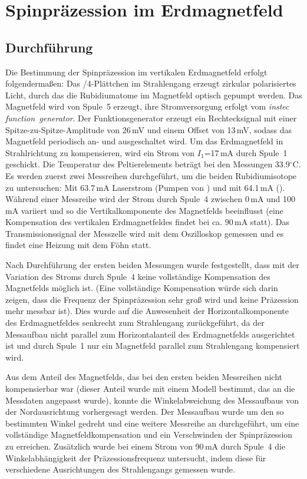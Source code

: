 \section{Spinpräzession im Erdmagnetfeld}
\subsection{Durchführung}
Die Bestimmung der Spinpräzession im vertikalen Erdmagnetfeld erfolgt folgendermaßen:
Das \textlambda/4-Plättchen im Strahlengang erzeugt zirkular polarisiertes Licht,
durch das die Rubidiumatome im Magnetfeld optisch gepumpt werden.
Das Magnetfeld wird von Spule~5 erzeugt, ihre Stromversorgung erfolgt vom \emph{instec function~generator}.
Der Funktionsgenerator erzeugt ein Rechtecksignal mit einer Spitze-zu-Spitze-Amplitude von 26\,mV und
einem Offset von 13\,mV, sodass das Magnetfeld periodisch an- und ausgeschaltet wird.
Um das Erdmagnetfeld in Strahlrichtung zu kompensieren,
wird ein Strom von $I_1$=17\,mA durch Spule~1 geschickt.
Die Temperatur des Peltierelements beträgt bei den Messungen 33.9$^\circ$C.
Es werden zuerst zwei Messreihen durchgeführt, um die beiden Rubidiumisotope zu untersuchen:
Mit 63.7\,mA Laserstrom (Pumpen von ) und mit 64.1\,mA ().
Während einer Messreihe wird der Strom durch Spule~4 zwischen 0\,mA und 100\,mA variiert und
so die Vertikalkomponente des Magnetfelds beeinflusst
(eine Kompensation des vertikalen Erdmagnetfeldes findet bei ca. 90\,mA statt).
Das Transmissionssignal der Messzelle wird mit dem Oszilloskop gemessen und
es findet eine Heizung mit dem Föhn statt.

Nach Durchführung der ersten beiden Messungen wurde festgestellt,
dass mit der Variation des Stroms durch Spule~4 keine vollständige Kompensation des Magnetfelds möglich ist.
(Eine vollständige Kompensation würde sich darin zeigen,
dass die Frequenz der Spinpräzession sehr groß wird und keine Präzession mehr messbar ist).
Dies wurde auf die Anwesenheit der Horizontalkomponente des Erdmagnetfeldes
senkrecht zum Strahlengang zurückgeführt, da der Messaufbau nicht parallel zum Horizontalanteil des
Erdmagnetfelds ausgerichtet ist und durch Spule~1 nur ein Magnetfeld parallel zum Strahlengang kompensiert wird.

Aus dem Anteil des Magnetfelds, das bei den ersten beiden Messreihen nicht kompensierbar war
(dieser Anteil wurde mit einem Modell bestimmt, das an die Messdaten angepasst wurde),
konnte die Winkelabweichung des Messaufbaus von der Nordausrichtung vorhergesagt werden.
Der Messaufbau wurde um den so bestimmten Winkel gedreht und eine weitere Messreihe an  durchgeführt,
um eine vollständige Magnetfeldkompensation und ein Verschwinden der Spinpräzession zu erreichen.
Zusätzlich wurde bei einem Strom von 90\,mA durch Spule~4 die Winkelabhängigkeit der Präzessionsfrequenz untersucht,
indem diese für verschiedene Ausrichtungen des Strahlengangs gemessen wurde.


